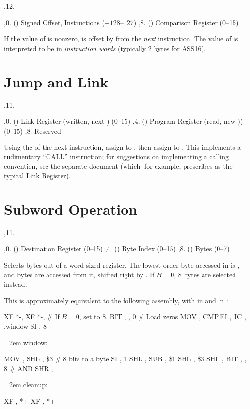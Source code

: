 \noindent\ins{},12. 

\li \ins{},0. () Signed Offset, Instructions ($-128$--$127$)
\li \ins{},8. () Comparison Register (0--15)

If the value of  is nonzero,  is offset by  from the
{\it next} instruction. The value of  is interpreted to be in {\it
instruction words} (typically 2 bytes for ASS16).

\section{Jump and Link}

\noindent\ins{},11. 

\li \ins{},0. () Link Register (written, next ) (0--15)
\li \ins{},4. () Program Register (read, new )) (0--15)
\li \ins{},8. Reserved

Using the  of the next instruction, assign  to , then
assign  to . This implements a rudimentary ``CALL'' instruction;
for suggestions on implementing a calling convention, see the separate
document (which, for example, prescribes  as the typical Link
Register).

\section{Subword Operation}

\noindent\ins{},11. 

\li \ins{},0. () Destination Register (0--15)
\li \ins{},4. () Byte Index (0--15)
\li \ins{},8. () Bytes (0--7)

Selects bytes out of a word-sized register. The lowest-order byte accessed in
 is , and  bytes are accessed from it, shifted right by
. If $B = 0$, 8 bytes are selected instead.

This is approximately equivalent to the following assembly, with  in
 and  in :

\startblock
	XF *-, 
	XF *-, 
	\# If $B = 0$, set  to 8.
	BIT , , 0  \# Load zeros
	MOV , 
	CMP.EI , 
	JC , .window
	SI , 8
{\leftskip=2em.window:\par}
	MOV , 
	SHL , \$3  \# 8 bits to a byte
	SI , 1
	SHL , 
	SUB , \$1
	SHL , \$3
	SHL , 
	BIT , , 8  \# AND
	SHR , 
{\leftskip=2em.cleanup:\par}
	XF , *+
	XF , *+
\endblock

